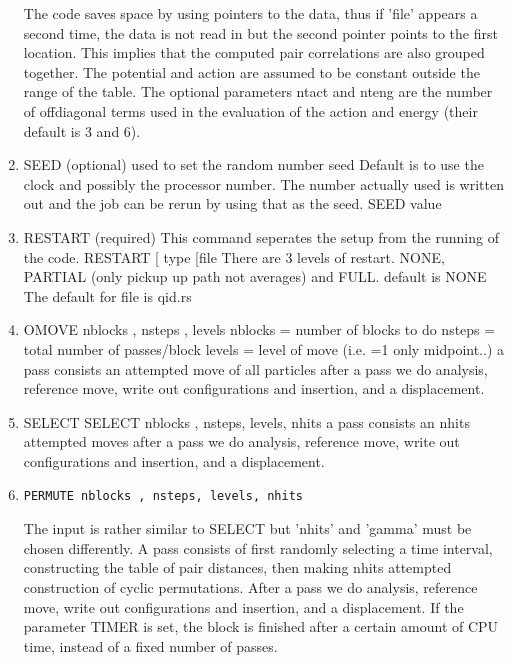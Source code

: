 \begin{enumerate}
The code saves space by using pointers to the data, thus if
'file' appears a second time, the data is not read in but
the second pointer points to the first location.  This implies
that the computed pair correlations are also grouped together.
The potential and action are assumed to be constant outside
the range of the table. 
The optional parameters ntact and nteng are the number of offdiagonal
terms used in the evaluation of the action and energy (their 
default is 3 and 6).  
 
\item  SEED (optional)
used to set the random number seed
Default is to use the clock and possibly the processor number.
The number actually used is written out and the job can be rerun by
using that as the seed.
\bv
SEED value
\ev

\item  RESTART (required)
This command seperates the setup from the running of the code.
\bv
RESTART [ type  [file
\ev
There are 3 levels of restart. NONE, PARTIAL (only pickup up 
path not averages) and FULL. default is NONE
The default for file is qid.rs
 
\item 
OMOVE nblocks , nsteps , levels
   nblocks = number of blocks to do
   nsteps = total number of passes/block
   levels = level of move (i.e. =1 only midpoint..)
       a pass consists an attempted move of all particles
       after a pass we do analysis, reference move, write out configurations
    and insertion, and a displacement.
 
\item  SELECT
\bv
SELECT nblocks , nsteps, levels, nhits
\ev
       a pass consists an nhits attempted moves
       after a pass we do analysis, reference move, write out configurations
    and insertion, and a displacement.
 
\item
\begin{verbatim}
PERMUTE nblocks , nsteps, levels, nhits
\end{verbatim}
The input is rather similar to SELECT but 'nhits' and 'gamma' must
be chosen differently.
A pass consists  of first randomly selecting a time interval,
constructing the table of pair distances, then making nhits attempted construction
of cyclic permutations.  
After a pass we do analysis, reference move, write out configurations
and insertion, and a displacement.
If the parameter TIMER is set, the block is finished after a certain amount
of CPU time, instead of a fixed number of passes.


\end{enumerate}
